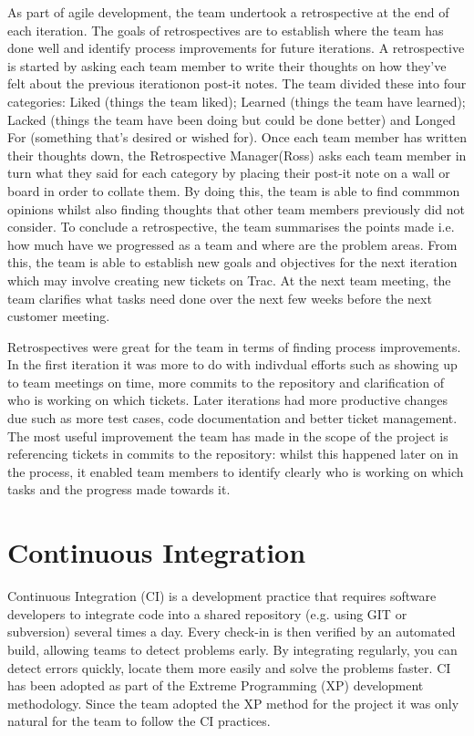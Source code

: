 \documentclass{l3proj}
\begin{document}
As part of agile development, the team undertook a retrospective at the end of each iteration. The goals of retrospectives are
to establish where the team has done well and identify process improvements for future iterations. A retrospective is started
by asking each team member to write their thoughts on how they've felt about the previous iterationon post-it notes.
The team divided these into four categories: Liked (things the team liked); Learned (things the team have learned);
Lacked (things the team have been doing but could be done better) and Longed For (something that's desired or wished for).
Once each team member has written their thoughts down, the Retrospective Manager(Ross) asks each team member in turn
what they said for each category by placing their post-it note on a wall or board in order to collate them. By doing this,
the team is able to find commmon opinions whilst also finding thoughts that other team members previously did not
consider. To conclude a retrospective, the team summarises the points made i.e. how much have we progressed as a team
and where are the problem areas. From this, the team is able to establish new goals and objectives for the next iteration
which may involve creating new tickets on Trac. At the next team meeting, the team clarifies what tasks need done over
the next few weeks before the next customer meeting.

Retrospectives were great for the team in terms of finding process improvements. In the first iteration it was more to
do with indivdual efforts such as showing up to team meetings on time, more commits to the repository and clarification
of who is working on which tickets. Later iterations had more productive changes due such as more test cases, code
documentation and better ticket management. The most useful improvement the team has made in the scope of the project
is referencing tickets in commits to the repository: whilst this happened later on in the process, it enabled team members
to identify clearly who is working on which tasks and the progress made towards it.


\section{Continuous Integration}
\label{sec:continuous-integration}

Continuous Integration (CI) is a development practice that requires software developers to integrate code into a shared
repository (e.g. using GIT or subversion) several times a day. Every check-in is then verified by an automated build,
allowing teams to detect problems early. By integrating regularly, you can detect errors quickly, locate them more easily
and solve the problems faster. CI has been adopted as part of the Extreme Programming (XP) development methodology.
Since the team adopted the XP method for the project it was only natural for the team to follow the CI practices.
\end{document}
